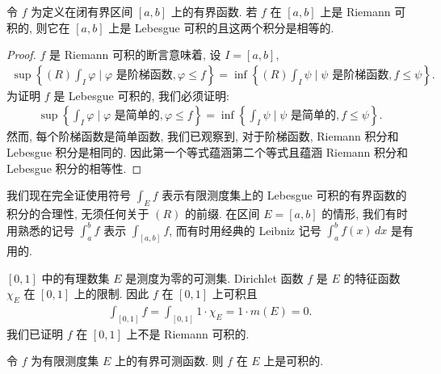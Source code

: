 \documentclass[../../main.tex]{subfiles}
\begin{document}
\begin{theorem}\label{theorem:ch04-Riemann蕴含Lebesgue}
令 $f$ 为定义在闭有界区间 $[a,b]$ 上的有界函数. 若 $f$ 在 $[a,b]$ 上是 Riemann 可积的, 则它在 $[a,b]$ 上是 Lebesgue 可积的且这两个积分是相等的.
\end{theorem}

\begin{proof}
$f$ 是 Riemann 可积的断言意味着, 设 $I=[a,b]$,
\begin{align*}
\sup\left\{(R)\int_{I}\varphi\mid\varphi\text{ 是阶梯函数},\varphi\leqslant f\right\}=\inf\left\{(R)\int_{I}\psi\mid\psi\text{ 是阶梯函数},f\leqslant\psi\right\}.
\end{align*}
为证明 $f$ 是 Lebesgue 可积的, 我们必须证明:
\begin{align*}
\sup\left\{\int_{I}\varphi\mid\varphi\text{ 是简单的},\varphi\leqslant f\right\}=\inf\left\{\int_{I}\psi\mid\psi\text{ 是简单的},f\leqslant\psi\right\}.
\end{align*}
然而, 每个阶梯函数是简单函数, 我们已观察到, 对于阶梯函数, Riemann 积分和 Lebesgue 积分是相同的. 因此第一个等式蕴涵第二个等式且蕴涵 Riemann 积分和 Lebesgue 积分的相等性.
\end{proof}

我们现在完全证使用符号 $\int_{E}f$ 表示有限测度集上的 Lebesgue 可积的有界函数的积分的合理性, 无须任何关于 $(R)$ 的前缀. 在区间 $E=[a,b]$ 的情形, 我们有时用熟悉的记号 $\int_{a}^{b}f$ 表示 $\int_{[a,b]}f$, 而有时用经典的 Leibniz 记号 $\int_{a}^{b}f(x)\,dx$ 是有用的.

\begin{example}\label{example:ch04-Dirichlet-Lebesgue}
$[0,1]$ 中的有理数集 $E$ 是测度为零的可测集. Dirichlet 函数 $f$ 是 $E$ 的特征函数 $\chi_{E}$ 在 $[0,1]$ 上的限制. 因此 $f$ 在 $[0,1]$ 上可积且
\begin{align*}
\int_{[0,1]}f=\int_{[0,1]}1\cdot\chi_{E}=1\cdot m(E)=0.
\end{align*}
我们已证明 $f$ 在 $[0,1]$ 上不是 Riemann 可积的.
\end{example}

\begin{theorem}\label{theorem:ch04-有界可测可积}
令 $f$ 为有限测度集 $E$ 上的有界可测函数. 则 $f$ 在 $E$ 上是可积的.
\end{theorem}
\end{document}
